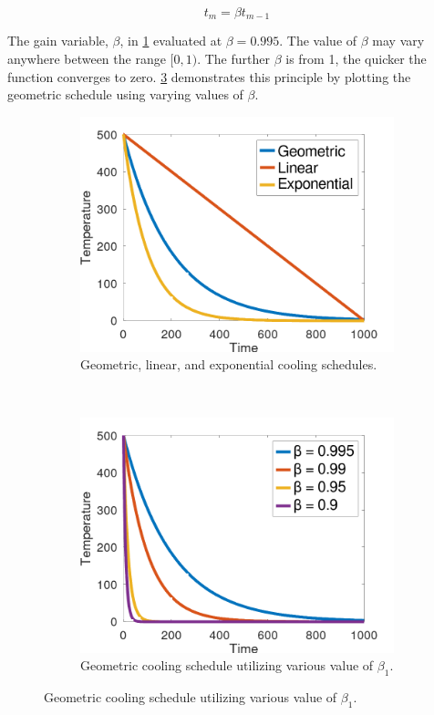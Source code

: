 \documentclass[ee,thesis]{usuthesis}
\begin{document}
\begin{equation}
\label{eq:cool}
t_m = \beta t_{m-1}
\end{equation}

The gain variable, \(\beta\), in \ref{fig:cool} evaluated at \(\beta = 0.995\). The value of \(\beta\) may vary anywhere between the range
\([0,1)\). The further \(\beta\) is from 1, the quicker the function converges to zero. \ref{fig:geometric} demonstrates this
principle by plotting the geometric schedule using varying values of \(\beta\).

\begin{figure}[t!]
  \begin{subfigure}[t]{0.5\textwidth}
    \centering \includegraphics[width=\textwidth]{img/cool_func.png}
    \caption{Geometric, linear, and exponential cooling schedules.}
    \label{fig:cool}
  \end{subfigure}
  ~
  \begin{subfigure}[t]{0.5\textwidth}
    \centering \includegraphics[width=\textwidth]{img/geometric.png}
    \caption{Geometric cooling schedule utilizing various value of $\beta_1$.}
    \label{fig:geometric}
  \end{subfigure}
\end{figure}
\end{document}
